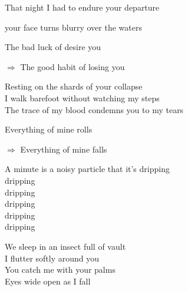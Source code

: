 \documentclass[12pt, twoside, a4paper]{report}
\begin{document}
\vspace{1.2em}

\begin{flushleft}
That night I had to endure your departure\\
\end{flushleft}

\begin{flushright}
your face turns blurry over the waters
\end{flushright}
\vspace{1.2em}

\noindent
\begin{minipage}[t]{0.48\textwidth}
The bad luck of desire you
\end{minipage}
\hfill
\begin{minipage}[t]{0.48\textwidth}
\RaggedLeft
$\Rightarrow$ The good habit of losing you
\end{minipage}

\begin{center}
Resting on the shards of your collapse\\
I walk barefoot without watching my steps\\
The trace of my blood condemns you to my tears
\end{center}


\noindent
\begin{minipage}[t]{0.48\textwidth}
Everything of mine rolls
\end{minipage}
\hfill
\begin{minipage}[t]{0.48\textwidth}
\RaggedLeft
$\Rightarrow$ Everything of mine falls
\end{minipage}

\vspace{1.2em}

\begin{center}
A minute is a noisy particle that it's dripping\\
dripping\\
dripping\\
dripping\\
dripping\\
dripping
\end{center}

\vspace{1.2em}

\noindent
\begin{center}
\RaggedRight
We sleep in an insect full of vault\\
I flutter softly around you\\
You catch me with your palms\\
Eyes wide open as I fall
\end{center}
\end{document}
